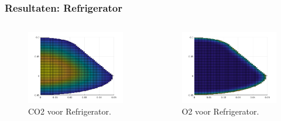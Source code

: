 \documentclass{beamer}
\begin{document}
\begin{frame}
\frametitle{Resultaten: Refrigerator}
\begin{columns}
\begin{column}{0.48\textwidth}
\begin{figure}
\includegraphics[width = 1\textwidth]{Refrigerator_pear_CO2_boven.png}
\caption{CO2 voor Refrigerator.}
\end{figure}
\end{column}
	
\begin{column}{0.48\textwidth}
\begin{figure}
\includegraphics[width = 1\textwidth]{Refrigerator_pear_O2_boven.png}
\caption{O2 voor Refrigerator.}
\end{figure}
\end{column}
\end{columns}
\end{frame}
\end{document}
